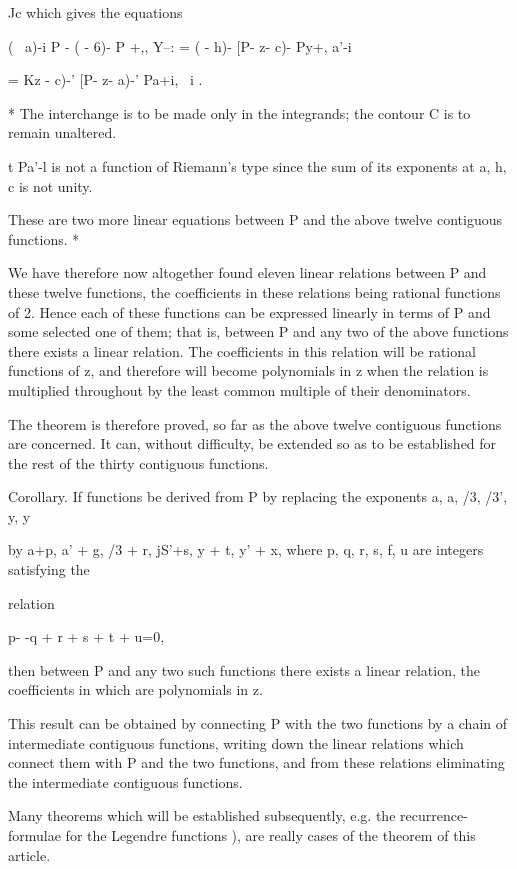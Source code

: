 Jc which gives the equations

( \ a)-i P - ( - 6)- P +,, Y--: = ( - h)- [P- z- c)- Py+, a'-i

= Kz - c)-' [P- z- a)-' Pa+i, \ i .

* The interchange is to be made only in the integrands; the contour C
is to remain unaltered.

t Pa'-l is not a function of Riemann's type since the sum of its
exponents at a, h, c is not unity.

%
%

These are two more linear equations between P and the above twelve
contiguous functions. *

We have therefore now altogether found eleven linear relations between
P and these twelve functions, the coefficients in these relations
being rational functions of 2. Hence each of these functions can be
expressed linearly in terms of P and some selected one of them; that
is, between P and any two of the above functions there exists a linear
relation. The coefficients in this relation will be rational functions
of z, and therefore will become polynomials in z when the relation is
multiplied throughout by the least common multiple of their
denominators.

The theorem is therefore proved, so far as the above twelve contiguous
functions are concerned. It can, without difficulty, be extended so as
to be established for the rest of the thirty contiguous functions.

Corollary. If functions be derived from P by replacing the exponents
a, a, /3, /3', y, y

by a+p, a' + g, /3 + r, jS'+s, y + t, y' + x, where p, q, r, s, f, u
are integers satisfying the

relation

p- -q + r + s + t + u=0,

then between P and any two such functions there exists a linear
relation, the coefficients in which are polynomials in z.

This result can be obtained by connecting P with the two functions by
a chain of intermediate contiguous functions, writing down the linear
relations which connect them with P and the two functions, and from
these relations eliminating the intermediate contiguous functions.

Many theorems which will be established subsequently, e.g. the
recurrence-formulae for the Legendre functions ), are really
cases of the theorem of this article.

